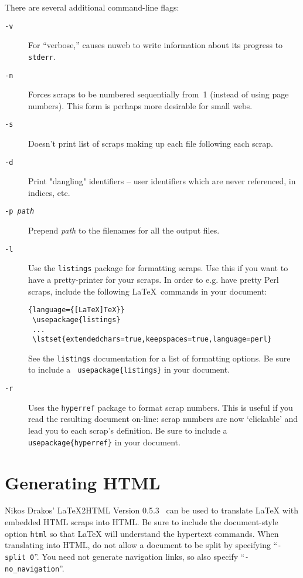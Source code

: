 \documentclass{report}
\begin{document}
There are several additional command-line flags:
\begin{description}
\item[\tt -v] For ``verbose,'' causes nuweb to write information about
  its progress to \verb|stderr|.
\item[\tt -n] Forces scraps to be numbered sequentially from~1
  (instead of using page numbers). This form is perhaps more desirable
  for small webs.
\item[\tt -s] Doesn't print list of scraps making up each file
  following each scrap.
\item[\tt -d] Print "dangling" identifiers -- user identifiers which
  are never referenced, in indices, etc.
\item[\tt -p \it path] Prepend \textit{path} to the filenames for
  all the output files.
\item[\texttt{-l}] \label{sec:pretty-print} Use the \texttt{listings}
   package for formatting scraps. Use this if you want to have a
   pretty-printer for your scraps. In order to e.g. have pretty Perl
   scraps, include the following \LaTeX\ commands in your document:
   \lstset{language=[LaTeX]TeX}
 
 \begin{lstlisting}{language={[LaTeX]TeX}}
 \usepackage{listings}
 ...
 \lstset{extendedchars=true,keepspaces=true,language=perl}
 \end{lstlisting}

 See the \texttt{listings} documentation for a list of formatting
 options. Be sure to include a \texttt{ usepackage\{listings\}}
 in your document.
\item[\texttt{-r}] Uses the \texttt{hyperref} package to format scrap
numbers. This is useful if you read the resulting document on-line:
scrap numbers are now `clickable' and lead you to each scrap's definition.
Be sure to include a \texttt{ usepackage\{hyperref\}}
 in your document.

\end{description}

\section{Generating HTML}

Nikos Drakos' {\LaTeX}2HTML Version 0.5.3~\cite{drakos:94} can be used
to translate {\LaTeX} with embedded HTML scraps into HTML\@.  Be sure
to include the document-style option \verb|html| so that {\LaTeX} will
understand the hypertext commands.  When translating into HTML, do not
allow a document to be split by specifying ``\verb|-split 0|''.  
You need not generate navigation links, so also specify
``\verb|-no_navigation|''.
\end{document}
